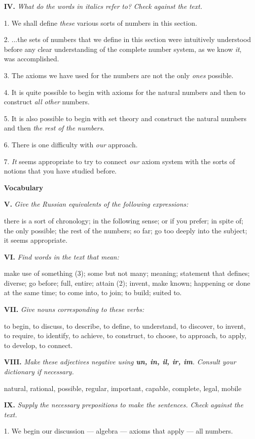 \documentclass[a4paper]{article}
\newcommand{\ESect}[1]{\medskip\par{\large \textbf{#1}}\par}
\newcommand{\ETask}[2]{\medskip\par\textbf{#1.} \textit{#2}\par}
\begin{document}
\ETask{IV}{What do the words in italics refer to? Check against the text.}

1. We shall define {\it these} various sorts of numbers in this section.

2. ...the sets of numbers that we define in this section were intuitively understood before any clear understanding of
the complete number system, as we know {\it it}, was accomplished.

3. The axioms we have used for the numbers are not the only {\it ones} possible.

4. It is quite possible to begin with axioms for the natural numbers and then to construct {\it all other} numbers.

5. It is also possible to begin with set theory and construct the natural numbers and then {\it the rest of the numbers}.

6. There is one difficulty with {\it our} approach.

7. {\it It} seems appropriate to try to connect {\it our} axiom system with the sorts of notions that you have studied before.

\ESect{Vocabulary}

\ETask{V}{Give the Russian equivalents of the following expressions:}
there is a sort of chronology; in the following sense; or if you prefer; in spite of; the only possible; the rest of the
numbers; so far; go too deeply into the subject; it seems appropriate.

\ETask{VI}{Find words in the text that mean:}
make use of something (3); some but not many; meaning; statement that defines; diverse; go before; full, entire; attain (2);
invent, make known; happening or done at the same time; to come into, to join; to build; suited to.

\ETask{VII}{Give nouns corresponding to these verbs:}
to begin, to discuss, to describe, to define, to understand, to discover, to invent, to require, to identify,
to achieve, to construct, to choose, to approach, to apply, to develop, to connect.

\ETask{VIII}{Make these adjectives negative using \textbf{un, in, il, ir, im}. Consult your dictionary if necessary.}
natural, rational, possible, regular, important, capable, complete, legal, mobile

\ETask{IX}{Supply the necessary prepositions to make the sentences. Check against the text.}

1. We begin our discussion --- algebra --- axioms that apply --- all numbers.
\end{document}
